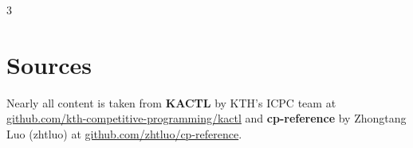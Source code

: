 \documentclass[9pt,letterpaper,notitlepage]{extreport}
\begin{document}
	\setcounter{page}{0}
	

	\renewcommand{\theFancyVerbLine}{\textcolor[HTML]{777b7d}{\footnotesize\arabic{FancyVerbLine}}}


	\setlength\multicolsep{0pt}
	\begin{multicols*}{3}
	\setcounter{tocdepth}{0}
	\tableofcontents
	\thispagestyle{fancy}
  \raggedcolumns

  \columnbreak
  \clearpage
  \clearpage

	\chapter{Sources}
	Nearly all content is taken from \textbf{KACTL} by KTH's ICPC team at \url{github.com/kth-competitive-programming/kactl} and \textbf{cp-reference} by Zhongtang Luo (zhtluo) at \url{github.com/zhtluo/cp-reference}.
	\end{multicols*}
\end{document}
